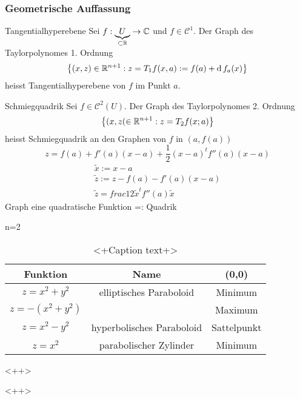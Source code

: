 \subsubsection{Geometrische Auffassung}
\begin{Def}{Tangentialhyperebene}
  Sei $f:\underbrace{U}_{\subset\mathbb{R}}\to \mathbb{C}$ und $f\in\mathcal{C}^1$. Der Graph des Taylorpolynomes 1. Ordnung
  \[\left\{ (x,z)\in\mathbb{R}^{n+1}:z=T_1f(x,a):=f(a)+\operatorname{d} f_a(x) \right\}\]
  heisst Tangentialhyperebene von $f$ im Punkt $a$.
\end{Def}
\begin{Def}{Schmiegquadrik}
  Sei $f\in\mathcal{C}^2(U)$. Der Graph des Taylorpolynomes 2. Ordnung
  \[\left\{ (x,z(\in\mathbb{R}^{n+1}:z=T_2f(x;a) \right\}\]
  heisst Schmiegquadrik an den Graphen von $f$ in $\left( a,f(a) \right)$
  \[z=f(a)+f'(a)(x-a)+\frac{1}{2}(x-a)^tf''(a)(x-a)\]
  \begin{gather*}
    \tilde x:=x-a\\
    \tilde z:=z-f(a)-f'(a)(x-a)\\
    \tilde z=frac{1}{2}\tilde x^tf''(a)\tilde x
  \end{gather*}
  Graph eine quadratische Funktion =: Quadrik
\end{Def}
\begin{Bsp}
  n=2
  \begin{table}
    \centering
    \begin{tabular}{c|c|c}
      Funktion&Name&(0,0)\\
      \hline
      $z=x^2+y^2$& elliptisches Paraboloid&Minimum\\
      $z=-(x^2+y^2)$&&Maximum\\
      \hline
      $z=x^2-y^2$&hyperbolisches Paraboloid&Sattelpunkt\\
      \hline
      $z=x^2$&parabolischer Zylinder&Minimum
      
    \end{tabular}
    \caption{<+Caption text+>}
    \label{tab:<+label+>}
  \end{table}<++>
\end{Bsp}<++>
